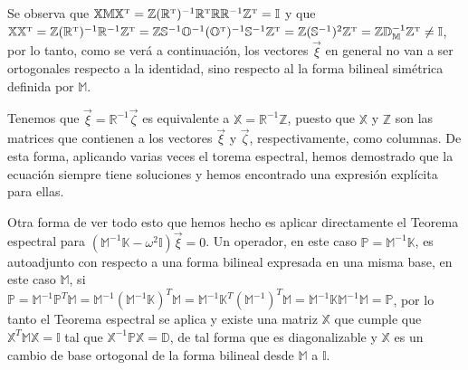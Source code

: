 Se observa que $\mathbb{X} \mathbb{M} \mathbb{X}^{\mbox{\tiny T}} =\mathbb{Z} (\mathbb{R}^{\mbox{\tiny T}})^{-1}\mathbb{R}^{\mbox{\tiny T}} \mathbb{R}\mathbb{R}^{-1} \mathbb{Z}^{\mbox{\tiny T}} =\mathbb{I}$ y que $\mathbb{X}\mathbb{X}^{\mbox{\tiny T}} = \mathbb{Z} (\mathbb{R}^{\mbox{\tiny T}})^{-1} \mathbb{R}^{-1} \mathbb{Z}^{\mbox{\tiny T}} = \mathbb{Z} \mathbb{S}^{-1} \mathbb{O}^{-1} (\mathbb{O}^{\mbox{\tiny T}})^{-1} \mathbb{S}^{-1} \mathbb{Z}^{\mbox{\tiny T}} =  \mathbb{Z} (\mathbb{S}^{-1})^2 \mathbb{Z}^{\mbox{\tiny T}} = \mathbb{Z} \mathbb{D}_\mathbb{M}^{-1} \mathbb{Z}^{\mbox{\tiny T}}\neq \mathbb{I}$, por lo tanto, como se verá a continuación, los vectores $\vec{\xi}$ en general no van a ser ortogonales respecto a la identidad, sino respecto al la forma bilineal simétrica definida por $\mathbb{M}$.

Tenemos que $\vec{\xi} = \mathbb{R}^{-1} \vec{\zeta}$ es equivalente a $\mathbb{X} = \mathbb{R}^{-1} \mathbb{Z}$, puesto que $\mathbb{X}$ y $\mathbb{Z}$ son las matrices que contienen a los vectores $\vec{\xi}$ y $\vec{\zeta}$, respectivamente, como columnas. De esta forma, aplicando varias veces el torema espectral, hemos demostrado que la ecuación siempre tiene soluciones y hemos encontrado una expresión explícita para ellas.

Otra forma de ver todo esto que hemos hecho es aplicar directamente el Teorema espectral para $(\mathbb{M}^{-1}\mathbb{K}-\omega^2 \mathbb{I})\vec{\xi} = 0$. Un operador, en este caso $\mathbb{P} = \mathbb{M}^{-1}\mathbb{K}$, es autoadjunto con respecto a una forma bilineal expresada en una misma base, en este caso $\mathbb{M}$, si $\mathbb{P} = \mathbb{M}^{-1} \mathbb{P}^T \mathbb{M} = \mathbb{M}^{-1} (\mathbb{M}^{-1}\mathbb{K})^T \mathbb{M}= \mathbb{M}^{-1} \mathbb{K}^T (\mathbb{M}^{-1})^T\mathbb{M} = \mathbb{M}^{-1} \mathbb{K} \mathbb{M}^{-1}\mathbb{M} = \mathbb{P}$, por lo tanto el Teorema espectral se aplica y existe una matriz $\mathbb{X}$ que cumple que $\mathbb{X}^T \mathbb{M}\mathbb{X} = \mathbb{I}$ tal que $\mathbb{X}^{-1} \mathbb{P} \mathbb{X} = \mathbb{D}$, de tal forma que es diagonalizable y $\mathbb{X}$ es un cambio de base ortogonal de la forma bilineal desde $\mathbb{M}$ a $\mathbb{I}$.

